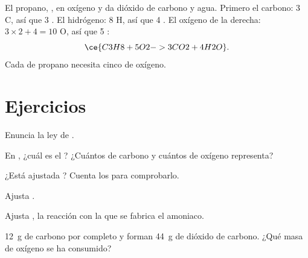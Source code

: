 \begin{example}\label{ex:g8:balanced-equations:propane}
El propano, ,  en oxígeno y da dióxido de carbono y agua.
Primero el carbono: 3 C, así que 3 . El hidrógeno: 8 H, así que
4 . El oxígeno de la derecha: $3 \times 2 + 4 = 10$ O, así que
5 :
\[
  \ce{C3H8 + 5O2 -> 3CO2 + 4H2O}.
\]
Cada  de propano necesita cinco  de oxígeno.
\end{example}

\section{Ejercicios}

\begin{exercise}[$\star$]\label{exo:g8:balanced-equations:1}
Enuncia la ley de .
\end{exercise}

\begin{exercise}[$\star$]\label{exo:g8:balanced-equations:2}
En , ¿cuál es el ? ¿Cuántos 
de carbono y cuántos  de oxígeno representa?
\end{exercise}

\begin{exercise}[$\star$]\label{exo:g8:balanced-equations:3}
¿Está ajustada ? Cuenta los  para comprobarlo.
\end{exercise}

\begin{exercise}[$\star$]\label{exo:g8:balanced-equations:4}
Ajusta . %
\end{exercise}

\begin{exercise}[$\star\star$]\label{exo:g8:balanced-equations:5}
Ajusta , la reacción con la que se fabrica el amoniaco. %
\end{exercise}

\begin{exercise}[$\star\star$]\label{exo:g8:balanced-equations:6}
\qty{12}{g} de carbono  por completo y forman \qty{44}{g} de
dióxido de carbono. ¿Qué masa de oxígeno se ha consumido?
\end{exercise}

